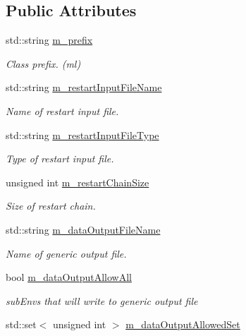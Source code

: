 \subsection*{Public Attributes}
\begin{DoxyCompactItemize}
\item 
std\-::string \hyperlink{class_q_u_e_s_o_1_1_m_l_sampling_options_a1d3d48598e0b59b46337ce66a52671a5}{m\-\_\-prefix}
\begin{DoxyCompactList}\small\item\em Class prefix. (ml) \end{DoxyCompactList}\item 
std\-::string \hyperlink{class_q_u_e_s_o_1_1_m_l_sampling_options_aff68336a5d6ae4160e541975260450d8}{m\-\_\-restart\-Input\-File\-Name}
\begin{DoxyCompactList}\small\item\em Name of restart input file. \end{DoxyCompactList}\item 
std\-::string \hyperlink{class_q_u_e_s_o_1_1_m_l_sampling_options_aae8adcb5188369ea144d2144b53cde48}{m\-\_\-restart\-Input\-File\-Type}
\begin{DoxyCompactList}\small\item\em Type of restart input file. \end{DoxyCompactList}\item 
unsigned int \hyperlink{class_q_u_e_s_o_1_1_m_l_sampling_options_a073caa3483cbca881934842451412681}{m\-\_\-restart\-Chain\-Size}
\begin{DoxyCompactList}\small\item\em Size of restart chain. \end{DoxyCompactList}\item 
std\-::string \hyperlink{class_q_u_e_s_o_1_1_m_l_sampling_options_a2507c0e8b86f9d6f07a3f5609593fc96}{m\-\_\-data\-Output\-File\-Name}
\begin{DoxyCompactList}\small\item\em Name of generic output file. \end{DoxyCompactList}\item 
bool \hyperlink{class_q_u_e_s_o_1_1_m_l_sampling_options_a530b32a42d38ca4112de8a06a2e760d3}{m\-\_\-data\-Output\-Allow\-All}
\begin{DoxyCompactList}\small\item\em sub\-Envs that will write to generic output file \end{DoxyCompactList}\item 
std\-::set$<$ unsigned int $>$ \hyperlink{class_q_u_e_s_o_1_1_m_l_sampling_options_aa5f7e589376e3700b0132c1fa91cccc9}{m\-\_\-data\-Output\-Allowed\-Set}
\end{DoxyCompactItemize}
